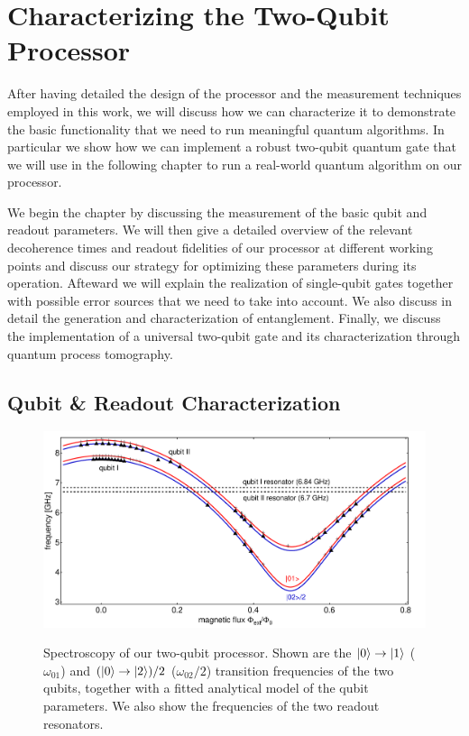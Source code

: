 \chapter{Characterizing the Two-Qubit Processor} \label{chapter:processor_characterization}

After having detailed the design of the processor and the measurement techniques employed in this work, we will discuss how we can characterize it to demonstrate the basic functionality that we need to run meaningful quantum algorithms. In particular we show how we can implement a robust two-qubit quantum gate that we will use in the following chapter to run a real-world quantum algorithm on our processor.

\smallskip

We begin the chapter by discussing the measurement of the basic qubit and readout parameters. We will then give a detailed overview of the relevant decoherence times and readout fidelities of our processor at different working points and discuss our strategy for optimizing these parameters during its operation. Afteward we will explain the realization of single-qubit gates together with possible error sources that we need to take into account. We also discuss in detail the generation and characterization of entanglement. Finally, we discuss the implementation of a universal two-qubit gate and its characterization through quantum process tomography.

\section{Qubit \& Readout Characterization}

\begin{figure}[ht!]
	\centering
		\includegraphics[width=1.\textwidth]{"./data/ct5/qubit frequencies/qubit_spectroscopy"}
	\label{fig:ProcessorSpectroscopy}
	\caption[Spectroscopy of the Two-Qubit Processor]{Spectroscopy of our two-qubit processor. Shown are the $\left| 0 \right>\to\left| 1 \right>$ ($\omega_{01}$) and $(\left| 0 \right>\to\left| 2 \right>)/2$ ($\omega_{02}/2$) transition frequencies of the two qubits, together with a fitted analytical model of the qubit parameters. We also show the frequencies of the two readout resonators.}
\end{figure}

